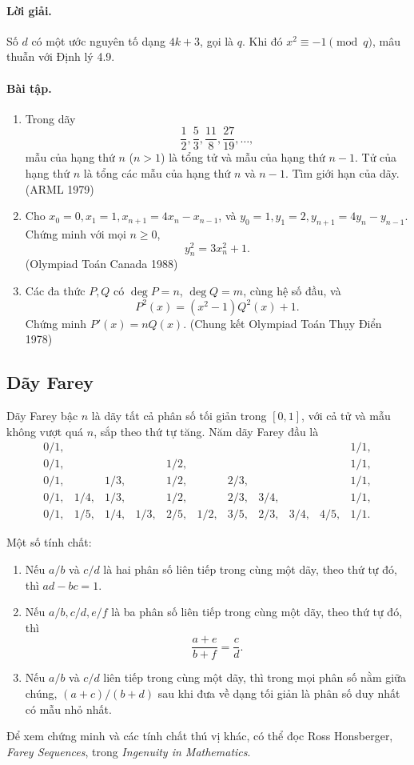 \documentclass[11pt]{article}
\begin{document}
\paragraph{Lời giải.}
Số \(d\) có một ước nguyên tố dạng \(4k+3\), gọi là \(q\). Khi đó
\(x^2\equiv-1\pmod q\), mâu thuẫn với Định lý 4.9.

\paragraph{Bài tập.}
\begin{enumerate}
\item Trong dãy
\[
 \frac12,\frac53,\frac{11}8,\frac{27}{19},\ldots,
\]
mẫu của hạng thứ \(n\) (\(n>1\)) là tổng tử và mẫu của hạng thứ \(n-1\). Tử
của hạng thứ \(n\) là tổng các mẫu của hạng thứ \(n\) và \(n-1\). Tìm giới hạn
của dãy. (ARML 1979)
\item Cho \(x_0=0,x_1=1,x_{n+1}=4x_n-x_{n-1}\), và
\(y_0=1,y_1=2,y_{n+1}=4y_n-y_{n-1}\). Chứng minh với mọi \(n\ge0\),
\[
 y_n^2=3x_n^2+1.
\]
(Olympiad Toán Canada 1988)
\item Các đa thức \(P,Q\) có \(\deg P=n\), \(\deg Q=m\), cùng hệ số đầu, và
\[
 P^2(x)=(x^2-1)Q^2(x)+1.
\]
Chứng minh \(P'(x)=nQ(x)\). (Chung kết Olympiad Toán Thụy Điển 1978)
\end{enumerate}

\subsection{Dãy Farey}

Dãy Farey bậc \(n\) là dãy tất cả phân số tối giản trong \([0,1]\), với cả tử
và mẫu không vượt quá \(n\), sắp theo thứ tự tăng. Năm dãy Farey đầu là
\[
\begin{array}{lllllllllll}
0/1,&&&&&&&&&&1/1,\\
0/1,&&&&1/2,&&&&&&1/1,\\
0/1,&&1/3,&&1/2,&&2/3,&&&&1/1,\\
0/1,&1/4,&1/3,&&1/2,&&2/3,&3/4,&&&1/1,\\
0/1,&1/5,&1/4,&1/3,&2/5,&1/2,&3/5,&2/3,&3/4,&4/5,&1/1.
\end{array}
\]

Một số tính chất:
\begin{enumerate}
\item Nếu \(a/b\) và \(c/d\) là hai phân số liên tiếp trong cùng một dãy, theo
thứ tự đó, thì \(ad-bc=1\).
\item Nếu \(a/b,c/d,e/f\) là ba phân số liên tiếp trong cùng một dãy, theo thứ
tự đó, thì
\[
 \frac{a+e}{b+f}=\frac cd.
\]
\item Nếu \(a/b\) và \(c/d\) liên tiếp trong cùng một dãy, thì trong mọi phân
số nằm giữa chúng, \((a+c)/(b+d)\) sau khi đưa về dạng tối giản là phân số duy nhất có mẫu
nhỏ nhất.
\end{enumerate}
Để xem chứng minh và các tính chất thú vị khác, có thể đọc Ross Honsberger,
\textit{Farey Sequences}, trong \textit{Ingenuity in Mathematics}.
\end{document}
